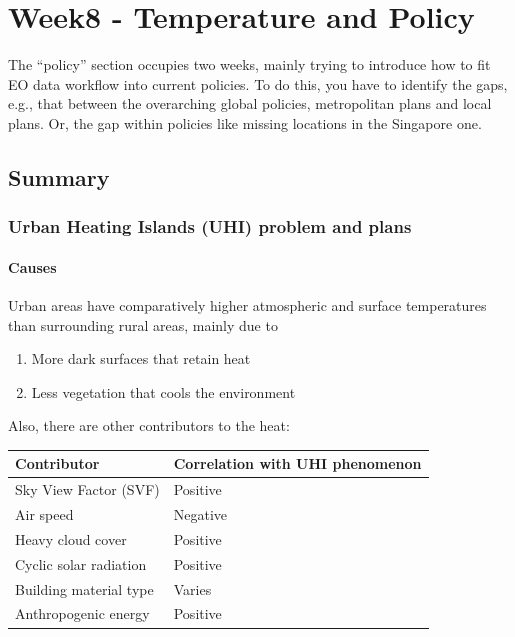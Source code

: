 \documentclass[
  letterpaper,
  DIV=11,
  numbers=noendperiod]{scrreprt}
\providecommand{\tightlist}{%
  \setlength{\itemsep}{0pt}\setlength{\parskip}{0pt}}\usepackage{longtable,booktabs,array}
\begin{document}

\hypertarget{week8---temperature-and-policy}{%
\chapter{\texorpdfstring{Week8 - T\textbf{emperature and
Policy}}{Week8 - Temperature and Policy}}\label{week8---temperature-and-policy}}

The ``policy'' section occupies two weeks, mainly trying to introduce
how to fit EO data workflow into current policies. To do this, you have
to identify the gaps, e.g., that between the overarching global
policies, metropolitan plans and local plans. Or, the gap within
policies like missing locations in the Singapore one.

\hypertarget{summary-6}{%
\section{Summary}\label{summary-6}}

\hypertarget{urban-heating-islands-uhi-problem-and-plans}{%
\subsection{Urban Heating Islands (UHI) problem and
plans}\label{urban-heating-islands-uhi-problem-and-plans}}

\hypertarget{causes}{%
\subsubsection{Causes}\label{causes}}

Urban areas have comparatively higher atmospheric and surface
temperatures than surrounding rural areas, mainly due to

\begin{enumerate}
\def\labelenumi{\arabic{enumi}.}
\tightlist
\item
  More dark surfaces that retain heat
\item
  Less vegetation that cools the environment
\end{enumerate}

Also, there are other contributors to the heat:

\begin{longtable}[]{@{}ll@{}}
\toprule()
Contributor & Correlation with UHI phenomenon \\
\midrule()
\endhead
Sky View Factor (SVF) & Positive \\
Air speed & Negative \\
Heavy cloud cover & Positive \\
Cyclic solar radiation & Positive \\
Building material type & Varies \\
Anthropogenic energy & Positive \\
\bottomrule()
\end{longtable}
\end{document}
